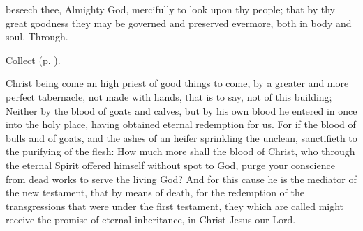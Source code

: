 \collect
{} beseech thee, Almighty God, mercifully to look upon thy people; that by thy great goodness they may be governed and preserved evermore, both in body and soul. Through.

\begin{rubric}
     Collect  (p. \pageref{AshWednesdayMassCollect}).
\end{rubric}

\vspace{-0.15\baselineskip}


\vspace{-0.1\baselineskip}

 Christ being come an high priest of good things to come, by a greater and more perfect tabernacle, not made with hands, that is to say, not of this building; Neither by the blood of goats and calves, but by his own blood he entered in once into the holy place, having obtained eternal redemption for us. For if the blood of bulls and of goats, and the ashes of an heifer sprinkling the unclean, sanctifieth to the purifying of the flesh: How much more shall the blood of Christ, who through the eternal Spirit offered himself without spot to God, purge your conscience from dead works to serve the living God? And for this cause he is the mediator of the new testament, that by means of death, for the redemption of the transgressions that were under the first testament, they which are called might receive the promise of eternal inheritance, in Christ Jesus our Lord.


\vspace{-0.4\baselineskip}


\vspace{-0.1\baselineskip}

